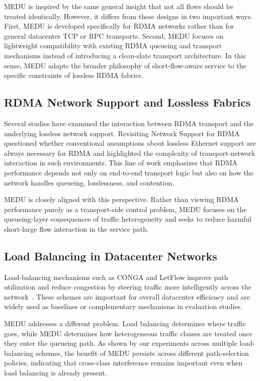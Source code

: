 \documentclass[conference]{IEEEtran}
\begin{document}
MEDU is inspired by the same general insight that not all flows should be treated identically. However, it differs from these designs in two important ways. First, MEDU is developed specifically for RDMA networks rather than for general datacenter TCP or RPC transports. Second, MEDU focuses on lightweight compatibility with existing RDMA queueing and transport mechanisms instead of introducing a clean-slate transport architecture. In this sense, MEDU adapts the broader philosophy of short-flow-aware service to the specific constraints of lossless RDMA fabrics.

\subsection{RDMA Network Support and Lossless Fabrics}

Several studies have examined the interaction between RDMA transport and the underlying lossless network support. Revisiting Network Support for RDMA~\cite{revisiting-rdma} questioned whether conventional assumptions about lossless Ethernet support are always necessary for RDMA and highlighted the complexity of transport-network interaction in such environments. This line of work emphasizes that RDMA performance depends not only on end-to-end transport logic but also on how the network handles queueing, losslessness, and contention.

MEDU is closely aligned with this perspective. Rather than viewing RDMA performance purely as a transport-side control problem, MEDU focuses on the queueing-layer consequences of traffic heterogeneity and seeks to reduce harmful short-large flow interaction in the service path.

\subsection{Load Balancing in Datacenter Networks}

Load-balancing mechanisms such as CONGA and LetFlow improve path utilization and reduce congestion by steering traffic more intelligently across the network~\cite{conga,letflow}. These schemes are important for overall datacenter efficiency and are widely used as baselines or complementary mechanisms in evaluation studies.

MEDU addresses a different problem. Load balancing determines where traffic goes, while MEDU determines how heterogeneous traffic classes are treated once they enter the queueing path. As shown by our experiments across multiple load-balancing schemes, the benefit of MEDU persists across different path-selection policies, indicating that cross-class interference remains important even when load balancing is already present.
\end{document}
